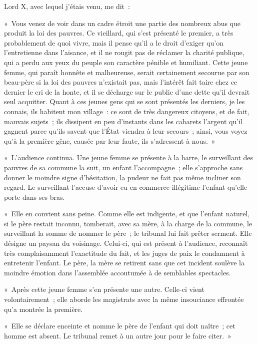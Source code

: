 \documentclass[twoside]{book} %
\newenvironment{quoteblock}
  {\begin{quoting}\setstretch{0.9}} %
  {\end{quoting}}
\newcommand{\quoteskip}{\medskip}
\newenvironment{quotebar}{%
    \def\FrameCommand{{\color{rubric!10!}\vrule width 0.5em} \hspace{0.9em}}%
    \def\OuterFrameSep{0pt} %
    \MakeFramed {\advance\hsize-\width \FrameRestore}
  }%
  {%
    \endMakeFramed
  }
\renewenvironment{quoteblock}%
  {%
    \savenotes
    \setstretch{0.9}
    \begin{quotebar}
    \smallskip
  }
  {%
    \smallskip
    \end{quotebar}
    \spewnotes
  }
\begin{document}
\noindent Lord X, avec lequel j’étais venu, me dit :\par
\quoteskip\begin{quoteblock}
 \noindent « Vous venez de voir dans un cadre étroit une partie des nombreux abus que produit la loi des pauvres. Ce vieillard, qui s’est présenté le premier, a très probablement de quoi vivre, mais il pense qu’il a le droit d’exiger qu’on l’entretienne dans l’aisance, et il ne rougit pas de réclamer la charité publique, qui a perdu aux yeux du peuple son caractère pénible et humiliant. Cette jeune femme, qui paraît honnête et malheureuse, serait certainement secourue par son beau-père si la loi des pauvres n’existait pas, mais l’intérêt fait taire chez ce dernier le cri de la honte, et il se décharge sur le public d’une dette qu’il devrait seul acquitter. Quant à ces jeunes gens qui se sont présentés les derniers, je les connais, ils habitent mon village : ce sont de très dangereux citoyens, et de fait, mauvais sujets ; ils dissipent en peu d’instants dans les cabarets l’argent qu’il gagnent parce qu’ils savent que l’État viendra à leur secours ; ainsi, vous voyez qu’à la première gêne, causée par leur faute, ils s’adressent à nous. »
 \end{quoteblock}\quoteskip
\begin{quoteblock}
 \noindent « L'audience continua. Une jeune femme se présente à la barre, le surveillant des pauvres de sa commune la suit, un enfant l’accompagne ; elle s’approche sans donner le moindre signe d’hésitation, la pudeur ne fait pas même incliner son regard. Le surveillant l’accuse d’avoir eu en commerce illégitime l’enfant qu’elle porte dans ses bras.\par
 « Elle en convient sans peine. Comme elle est indigente, et que l’enfant naturel, si le père restait inconnu, tomberait, avec sa mère, à la charge de la commune, le surveillant la somme de nommer le père ; le tribunal lui fait prêter serment. Elle désigne un paysan du voisinage. Celui-ci, qui est présent à l’audience, reconnaît très complaisamment l’exactitude du fait, et les juges de paix le condamnent à entretenir l’enfant. Le père, la mère se retirent sans que cet incident soulève la moindre émotion dans l’assemblée accoutumée à de semblables spectacles.\par
 « Après cette jeune femme s’en présente une autre. Celle-ci vient volontairement ; elle aborde les magistrats avec la même insouciance effrontée qu’a montrée la première.\par
 « Elle se déclare enceinte et nomme le père de l’enfant qui doit naître ; cet homme est absent. Le tribunal remet à un autre jour pour le faire citer. »
 \end{quoteblock}\quoteskip
\end{document}
